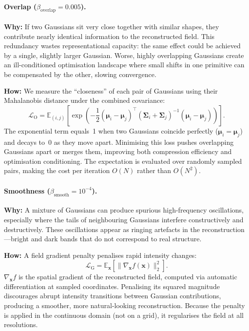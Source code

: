 \documentclass[11pt,a4paper]{article}
\begin{document}
\paragraph{Overlap ($\beta_{\text{overlap}} = 0.005$).}
\textbf{Why:} If two Gaussians sit very close together with similar shapes, they contribute nearly identical information to the reconstructed field.  This redundancy wastes representational capacity: the same effect could be achieved by a single, slightly larger Gaussian.  Worse, highly overlapping Gaussians create an ill-conditioned optimisation landscape where small shifts in one primitive can be compensated by the other, slowing convergence.

\textbf{How:} We measure the ``closeness'' of each pair of Gaussians using their Mahalanobis distance under the combined covariance:
\begin{equation}
\mathcal{L}_{\mathrm{O}} = \mathbb{E}_{(i,j)}\left[\exp\left(-\frac{1}{2}(\boldsymbol{\mu}_i-\boldsymbol{\mu}_j)^\top(\boldsymbol{\Sigma}_i+\boldsymbol{\Sigma}_j)^{-1}(\boldsymbol{\mu}_i-\boldsymbol{\mu}_j)\right)\right].
\label{eq:overlap}
\end{equation}
The exponential term equals~1 when two Gaussians coincide perfectly ($\boldsymbol{\mu}_i = \boldsymbol{\mu}_j$) and decays to~0 as they move apart.  Minimising this loss pushes overlapping Gaussians apart or merges them, improving both compression efficiency and optimisation conditioning.  The expectation is evaluated over randomly sampled pairs, making the cost per iteration $O(N)$ rather than $O(N^2)$.

\paragraph{Smoothness ($\beta_{\text{smooth}} = 10^{-4}$).}
\textbf{Why:} A mixture of Gaussians can produce spurious high-frequency oscillations, especially where the tails of neighbouring Gaussians interfere constructively and destructively.  These oscillations appear as ringing artefacts in the reconstruction---bright and dark bands that do not correspond to real structure.

\textbf{How:} A field gradient penalty penalises rapid intensity changes:
\begin{equation}
\mathcal{L}_{\mathrm{G}} = \mathbb{E}_{\mathbf{x}}[\|\nabla_{\mathbf{x}} f(\mathbf{x})\|_2^2].
\label{eq:smoothness}
\end{equation}
$\nabla_{\mathbf{x}} f$ is the spatial gradient of the reconstructed field, computed via automatic differentiation at sampled coordinates.  Penalising its squared magnitude discourages abrupt intensity transitions between Gaussian contributions, producing a smoother, more natural-looking reconstruction.  Because the penalty is applied in the continuous domain (not on a grid), it regularises the field at all resolutions.
\end{document}
